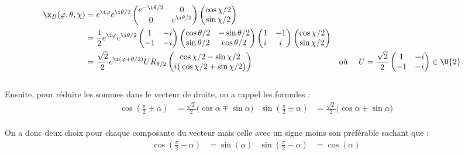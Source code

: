 \begin{align*}
	\x_B(\varphi, \theta, \chi) &= e^{\i \varphi} e^{\i \theta/2}\begin{pmatrix}
		e^{-\i \theta/2} & 0 \\
		0 & e^{\i \theta/2}
	\end{pmatrix}\begin{pmatrix} 
		\cos \chi/2 \\ 
		\sin \chi/2 
	\end{pmatrix} \\
	&= \frac{1}{2}e^{\i \varphi} e^{\i \theta/2}\begin{pmatrix} 
		1 & -i \\
		-1 & -i
	\end{pmatrix}\begin{pmatrix} 
		\cos \theta/2 & -\sin \theta/2 \\ 
		\sin \theta/2 & \cos \theta/2 
	\end{pmatrix} \begin{pmatrix} 
		1 & -1 \\ i & i
	\end{pmatrix}\begin{pmatrix} 
		\cos \chi/2 \\ 
		\sin\chi/2
	\end{pmatrix} \\
	&= \frac{\sqrt{2}}{2}e^{\i (\varphi + \theta/2)}U R_{\theta/2} \begin{pmatrix} 
		\cos \chi/2 - \sin\chi/2 \\ 
		i\big(\cos\chi/2 + \sin\chi/2\big)
	\end{pmatrix}   & &\text{où }\quad U = \frac{\sqrt{2}}{2}\begin{pmatrix} 
		1 & -i \\ -1 & -i
	\end{pmatrix}\in \U{2} \\
\end{align*}
\\
Ensuite, pour réduire les sommes dans le vecteur de droite, on a rappel les formules :
\begin{align*}
	\cos\left( \frac{\pi}{2} \pm \alpha\right) &= \frac{\sqrt{2}}{2}\big( \cos\alpha \mp \sin \alpha \big) & \sin\left( \frac{\pi}{2} \pm \alpha\right) &= \frac{\sqrt{2}}{2}\big( \cos\alpha \pm \sin \alpha \big)
\end{align*}
\\ 
On a donc deux choix pour chaque composante du vecteur mais celle avec un signe moins son préférable sachant que : 
\begin{align*}
	\cos\left( \frac{\pi}{2} - \alpha\right) &= \sin(\alpha) &  \sin\left( \frac{\pi}{2} - \alpha\right) &= \cos(\alpha)
\end{align*}
